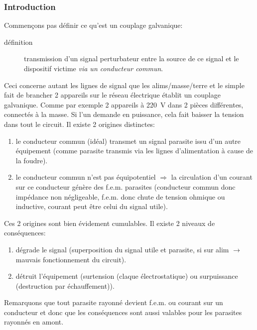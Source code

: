 \subsubsection{Introduction}
Commençons pas définir ce qu'est un couplage galvanique:
\begin{description}
	\item[définition] transmission d'un signal perturbateur entre la source de ce signal et le dispositif victime \emph{via un conducteur commun}.
\end{description}
Ceci concerne autant les lignes de signal que les alims/masse/terre et le simple fait de brancher 2 appareils sur le réseau électrique établit un couplage galvanique. Comme par exemple 2 appareils à \SI{220}{\volt} dans 2 pièces différentes, connectés à la masse. Si l'un demande en puissance, cela fait baisser la tension dans tout le circuit. Il existe 2 origines distinctes:
\begin{enumerate}
	\item le conducteur commun (idéal) transmet un signal parasite issu d'un autre équipement (comme parasite transmis via les lignes d'alimentation à cause de la foudre).
	\item le conducteur commun n'est pas équipotentiel \(\Rightarrow\) la circulation d'un courant sur ce conducteur génère des f.e.m. parasites (conducteur commun donc impédance non négligeable, f.e.m. donc chute de tension ohmique ou inductive, courant peut être celui du signal utile).
\end{enumerate}
Ces 2 origines sont bien évidement cumulables. Il existe 2 niveaux de conséquences:
\begin{enumerate}
	\item dégrade le signal (superposition du signal utile et parasite, si sur alim \(\rightarrow\) mauvais fonctionnement du circuit).
	\item détruit l'équipement (surtension (claque électrostatique) ou surpuissance (destruction par échauffement)).
\end{enumerate}
Remarquons que tout parasite rayonné devient f.e.m. ou courant sur un conducteur et donc que les conséquences sont aussi valables pour les parasites rayonnés en amont.
